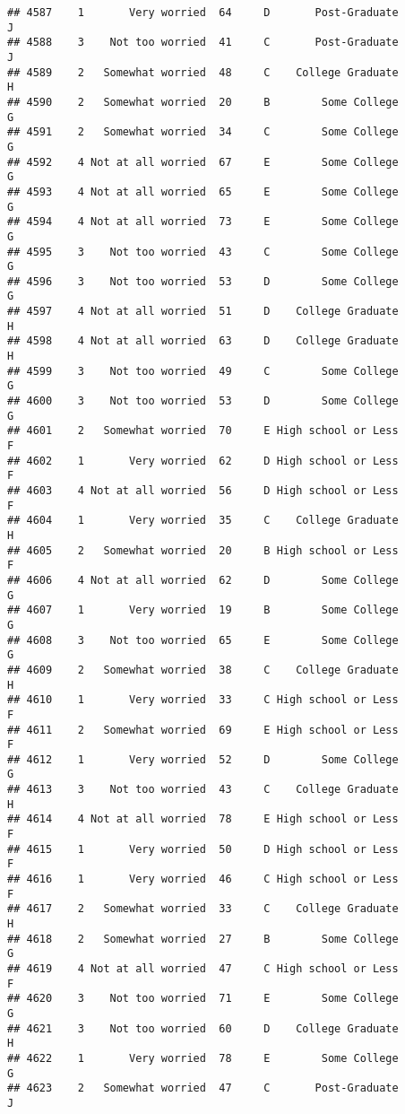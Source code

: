 \documentclass[
]{article}
\begin{document}
\begin{verbatim}
## 4587    1       Very worried  64     D       Post-Graduate         J
## 4588    3    Not too worried  41     C       Post-Graduate         J
## 4589    2   Somewhat worried  48     C    College Graduate         H
## 4590    2   Somewhat worried  20     B        Some College         G
## 4591    2   Somewhat worried  34     C        Some College         G
## 4592    4 Not at all worried  67     E        Some College         G
## 4593    4 Not at all worried  65     E        Some College         G
## 4594    4 Not at all worried  73     E        Some College         G
## 4595    3    Not too worried  43     C        Some College         G
## 4596    3    Not too worried  53     D        Some College         G
## 4597    4 Not at all worried  51     D    College Graduate         H
## 4598    4 Not at all worried  63     D    College Graduate         H
## 4599    3    Not too worried  49     C        Some College         G
## 4600    3    Not too worried  53     D        Some College         G
## 4601    2   Somewhat worried  70     E High school or Less         F
## 4602    1       Very worried  62     D High school or Less         F
## 4603    4 Not at all worried  56     D High school or Less         F
## 4604    1       Very worried  35     C    College Graduate         H
## 4605    2   Somewhat worried  20     B High school or Less         F
## 4606    4 Not at all worried  62     D        Some College         G
## 4607    1       Very worried  19     B        Some College         G
## 4608    3    Not too worried  65     E        Some College         G
## 4609    2   Somewhat worried  38     C    College Graduate         H
## 4610    1       Very worried  33     C High school or Less         F
## 4611    2   Somewhat worried  69     E High school or Less         F
## 4612    1       Very worried  52     D        Some College         G
## 4613    3    Not too worried  43     C    College Graduate         H
## 4614    4 Not at all worried  78     E High school or Less         F
## 4615    1       Very worried  50     D High school or Less         F
## 4616    1       Very worried  46     C High school or Less         F
## 4617    2   Somewhat worried  33     C    College Graduate         H
## 4618    2   Somewhat worried  27     B        Some College         G
## 4619    4 Not at all worried  47     C High school or Less         F
## 4620    3    Not too worried  71     E        Some College         G
## 4621    3    Not too worried  60     D    College Graduate         H
## 4622    1       Very worried  78     E        Some College         G
## 4623    2   Somewhat worried  47     C       Post-Graduate         J

\end{verbatim}
\end{document}
